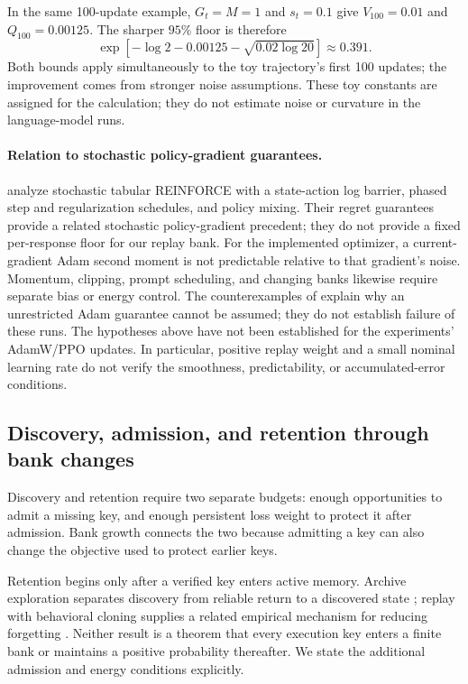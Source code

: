 In the same 100-update example, $G_t=M=1$ and $s_t=0.1$ give
$V_{100}=0.01$ and $Q_{100}=0.00125$. The sharper $95\%$ floor is therefore
\[
 \exp\!\left[-\log2-0.00125-\sqrt{0.02\log20}\right]\approx0.391.
\]
Both bounds apply simultaneously to the toy trajectory's first 100 updates;
the improvement comes from stronger noise assumptions. These toy constants are assigned for the calculation; they do not
estimate noise or curvature in the language-model runs.

\paragraph{Relation to stochastic policy-gradient guarantees.}
\citet{zhang2021reinforce} analyze stochastic tabular REINFORCE with a
state-action log barrier, phased step and regularization schedules, and
policy mixing. Their regret guarantees provide a related stochastic
policy-gradient precedent; they do not provide a fixed per-response floor
for our replay bank. For the implemented optimizer, a current-gradient Adam
second moment is not predictable relative to that gradient's noise.
Momentum, clipping, prompt scheduling, and changing banks likewise require
separate bias or energy control. The counterexamples of
\citet{reddi2018adam} explain why an unrestricted Adam guarantee cannot be
assumed; they do not establish failure of these runs. The hypotheses above
have not been established for the experiments' AdamW/PPO updates. In
particular, positive replay weight and a small nominal learning rate do not
verify the smoothness, predictability, or accumulated-error conditions.

\subsection{Discovery, admission, and retention through bank changes}
\label{app:theory-discovery-admission}

Discovery and retention require two separate budgets: enough opportunities
to admit a missing key, and enough persistent loss weight to protect it
after admission. Bank growth connects the two because admitting a key can
also change the objective used to protect earlier keys.

Retention begins only after a verified key enters active memory. Archive
exploration separates discovery from reliable return to a discovered state
\citep{ecoffet2021return}; replay with behavioral cloning supplies a related
empirical mechanism for reducing forgetting \citep{rolnick2019replay}.
Neither result is a theorem that every execution key enters a finite bank
or maintains a positive probability thereafter. We state the additional
admission and energy conditions explicitly.

